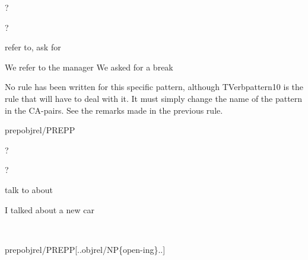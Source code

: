 
\begin{thetadescr}
\evitem ?
\esitem
     \begin{examples}
        \example ?
     \end{examples}
\end{thetadescr}



\begin{thetadescr}
\evitem refer to, ask for
\esitem
     \begin{examples}
        \example  We refer to the manager
        \example  We asked for a break
     \end{examples}
\end{thetadescr}


\newpage
{}
\begin{vpattern}
 No rule has been written for this specific pattern, although 
TVerbpattern10 is the rule that will have to deal with it. It must simply 
change the name of the pattern in the CA-pairs. See the remarks made in the 
previous rule.
\csritem \mbox{}\\
     \begin{csr}
       prepobjrel/PREPP
     \end{csr}
\remarksitem
\end{vpattern}


\begin{thetadescr}
\evitem ?
\esitem
     \begin{examples}
        \example ?
     \end{examples}
\end{thetadescr}



\begin{thetadescr}
\evitem talk to about
\esitem
     \begin{examples}
        \example  I talked about a new car
     \end{examples}
\end{thetadescr}


\newpage
{}
\begin{vpattern}
 \norule
\csritem \mbox{}\\
     \begin{csr}
       prepobjrel/PREPP[..objrel/NP\{open-ing\}..]
     \end{csr}
\remarksitem
\end{vpattern}

